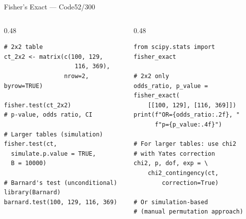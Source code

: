 \documentclass[10pt]{beamer}
\newcommand{\smark}[1]{\hfill{\scriptsize\color{codegray}#1}}
\begin{document}
\begin{frame}[fragile]{Fisher's Exact --- Code}\smark{52/300}
\begin{columns}[T]
\begin{column}{0.48\textwidth}
\begin{lstlisting}[style=Rstyle]
# 2x2 table
ct_2x2 <- matrix(c(100, 129,
                    116, 369),
                 nrow=2, byrow=TRUE)

fisher.test(ct_2x2)
# p-value, odds ratio, CI

# Larger tables (simulation)
fisher.test(ct,
  simulate.p.value = TRUE,
  B = 10000)

# Barnard's test (unconditional)
library(Barnard)
barnard.test(100, 129, 116, 369)
\end{lstlisting}
\end{column}
\begin{column}{0.48\textwidth}
\begin{lstlisting}[style=Pystyle]
from scipy.stats import fisher_exact

# 2x2 only
odds_ratio, p_value = fisher_exact(
    [[100, 129], [116, 369]])
print(f"OR={odds_ratio:.2f}, "
      f"p={p_value:.4f}")

# For larger tables: use chi2
# with Yates correction
chi2, p, dof, exp = \
    chi2_contingency(ct,
        correction=True)

# Or simulation-based
# (manual permutation approach)
\end{lstlisting}
\end{column}
\end{columns}
\end{frame}
\end{document}
